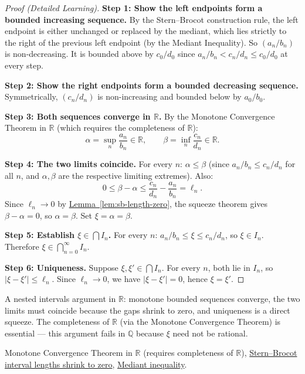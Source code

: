 \begin{proof}[Proof (Detailed Learning)]
\textbf{Step 1: Show the left endpoints form a bounded increasing sequence.}
By the Stern--Brocot construction rule, the left endpoint is either
unchanged or replaced by the mediant, which lies strictly to the right of
the previous left endpoint (by the Mediant Inequality).  So $(a_n/b_n)$
is non-decreasing.  It is bounded above by $c_0/d_0$ since $a_n/b_n <
c_n/d_n \leq c_0/d_0$ at every step.

\textbf{Step 2: Show the right endpoints form a bounded decreasing sequence.}
Symmetrically, $(c_n/d_n)$ is non-increasing and bounded below by $a_0/b_0$.

\textbf{Step 3: Both sequences converge in $\mathbb{R}$.}
By the Monotone Convergence Theorem in $\mathbb{R}$ (which requires the
completeness of $\mathbb{R}$):
\[
\alpha = \sup_n \frac{a_n}{b_n} \in \mathbb{R}, \qquad
\beta = \inf_n \frac{c_n}{d_n} \in \mathbb{R}.
\]

\textbf{Step 4: The two limits coincide.}
For every $n$: $\alpha \leq \beta$ (since $a_n/b_n \leq c_n/d_n$ for
all $n$, and $\alpha, \beta$ are the respective limiting extremes).
Also:
\[
0 \leq \beta - \alpha \leq \frac{c_n}{d_n} - \frac{a_n}{b_n} = \ell_n.
\]
Since $\ell_n \to 0$ by \hyperref[lem:sb-length-zero]{Lemma~\ref*{lem:sb-length-zero}},
the squeeze theorem gives $\beta - \alpha = 0$, so $\alpha = \beta$.
Set $\xi = \alpha = \beta$.

\textbf{Step 5: Establish $\xi \in \bigcap I_n$.}
For every $n$: $a_n/b_n \leq \xi \leq c_n/d_n$, so $\xi \in I_n$.
Therefore $\xi \in \bigcap_{n=0}^{\infty} I_n$.

\textbf{Step 6: Uniqueness.}
Suppose $\xi, \xi' \in \bigcap I_n$.  For every $n$, both lie in $I_n$,
so $|\xi - \xi'| \leq \ell_n$.  Since $\ell_n \to 0$, we have
$|\xi - \xi'| = 0$, hence $\xi = \xi'$.
\end{proof}

\begin{remark*}
A nested intervals argument in $\mathbb{R}$: monotone bounded sequences
converge, the two limits must coincide because the gaps shrink to zero,
and uniqueness is a direct squeeze.  The completeness of $\mathbb{R}$
(via the Monotone Convergence Theorem) is essential — this argument
fails in $\mathbb{Q}$ because $\xi$ need not be rational.
\end{remark*}

\begin{dependencies}
Monotone Convergence Theorem in $\mathbb{R}$ (requires completeness of $\mathbb{R}$),
\hyperref[lem:sb-length-zero]{Stern--Brocot interval lengths shrink to zero},
\hyperref[thm:mediant-inequality]{Mediant inequality}.
\end{dependencies}
